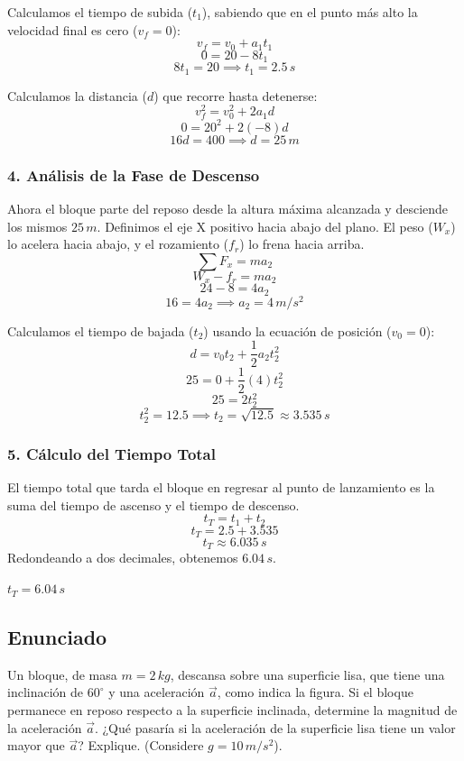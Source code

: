 \documentclass[12pt, a4paper]{article}
\begin{document}
Calculamos el tiempo de subida ($t_1$), sabiendo que en el punto más alto la velocidad final es cero ($v_f = 0$):
$$ v_f = v_0 + a_1 t_1 $$
$$ 0 = 20 - 8 t_1 $$
$$ 8 t_1 = 20 \implies t_1 = 2.5 \, \si{s} $$

Calculamos la distancia ($d$) que recorre hasta detenerse:
$$ v_f^2 = v_0^2 + 2 a_1 d $$
$$ 0 = 20^2 + 2(-8) d $$
$$ 16 d = 400 \implies d = 25 \, \si{m} $$

\subsubsection*{4. Análisis de la Fase de Descenso}
Ahora el bloque parte del reposo desde la altura máxima alcanzada y desciende los mismos $25 \, \si{m}$. Definimos el eje X positivo hacia abajo del plano. El peso ($W_x$) lo acelera hacia abajo, y el rozamiento ($f_r$) lo frena hacia arriba.
$$ \sum F_x = m a_2 $$
$$ W_x - f_r = m a_2 $$
$$ 24 - 8 = 4 a_2 $$
$$ 16 = 4 a_2 \implies a_2 = 4 \, \si{m/s^2} $$

Calculamos el tiempo de bajada ($t_2$) usando la ecuación de posición ($v_0 = 0$):
$$ d = v_0 t_2 + \frac{1}{2} a_2 t_2^2 $$
$$ 25 = 0 + \frac{1}{2}(4) t_2^2 $$
$$ 25 = 2 t_2^2 $$
$$ t_2^2 = 12.5 \implies t_2 = \sqrt{12.5} \approx 3.535 \, \si{s} $$

\subsubsection*{5. Cálculo del Tiempo Total}
El tiempo total que tarda el bloque en regresar al punto de lanzamiento es la suma del tiempo de ascenso y el tiempo de descenso.
$$ t_T = t_1 + t_2 $$
$$ t_T = 2.5 + 3.535 $$
$$ t_T \approx 6.035 \, \si{s} $$
Redondeando a dos decimales, obtenemos $6.04 \, \si{s}$.

\begin{tcolorbox}[colback=green!5!white, colframe=green!50!black, title=Respuesta Final]
\centering \Large $t_T = 6.04 \, \si{s}$
\end{tcolorbox}

\newpage

\subsection*{Enunciado}
Un bloque, de masa $m = 2 \, \si{kg}$, descansa sobre una superficie lisa, que tiene una inclinación de $60^\circ$ y una aceleración $\vec{a}$, como indica la figura. Si el bloque permanece en reposo respecto a la superficie inclinada, determine la magnitud de la aceleración $\vec{a}$. ¿Qué pasaría si la aceleración de la superficie lisa tiene un valor mayor que $\vec{a}$? Explique. (Considere $g = 10 \, \si{m/s^2}$).
\end{document}

